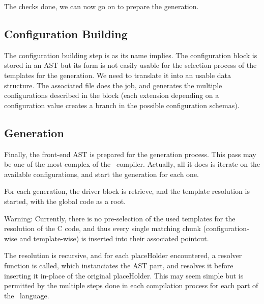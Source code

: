 \documentclass[american]{rtxreport}
\begin{document}
The checks done, we can now go on to prepare the generation.

\subsection{Configuration Building}

The configuration building step is as its name implies. The configuration block
is stored in an AST but its form is not easily usable for the selection process
of the templates for the generation. We need to translate it into an usable
data structure. The associated file does the job, and generates the multiple
configurations described in the block (each extension depending on a
configuration value creates a branch in the possible configuration schemas).

\subsection{Generation}

Finally, the front-end AST is prepared for the generation process. This pass
may be one of the most complex of the \rtx\ compiler. Actually, all it does is
iterate on the available configurations, and start the generation for each one.

For each generation, the driver block is retrieve, and the template resolution
is started, with the global code as a root.

Warning: Currently, there is no pre-selection of the used templates for the
resolution of the C code, and thus every single matching chunk
(configuration-wise and template-wise) is inserted into their associated
pointcut.

The resolution is recursive, and for each placeHolder encountered, a resolver
function is called, which instanciates the AST part, and resolves it before
inserting it in-place of the original placeHolder. This may seem simple but
is permitted by the multiple steps done in each compilation process for
each part of the \rtx\ language.

%
%
\end{document}
